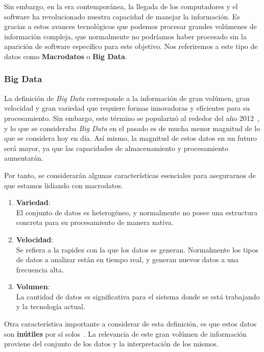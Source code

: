 Sin embargo, en la era contemporánea, la llegada de los computadores y el software ha revolucionado nuestra capacidad de manejar la información. Es gracias a estos avances tecnológicos que podemos procesar grandes volúmenes de información compleja, que normalmente no podríamos haber procesado sin la aparición de software específico para este objetivo. Nos referiremos a este tipo de datos como \textbf{Macrodatos} o \textbf{Big Data}\cite{mcafee2012bigdata}.

\subsubsection{Big Data}

La definición de \textit{Big Data} corresponde a la información de gran volúmen, gran velocidad y gran variedad que requiere formas innovadoras y eficientes para su procesamiento. Sin embargo, este término se popularizó al rededor del año 2012~\cite{diebold2012bigdata}, y lo que se consideraba \textit{Big Data} en el pasado es de mucha menor magnitud de lo que se considera hoy en día. Así mismo, la magnitud de estos datos en un futuro será mayor, ya que las capacidades de almacenamiento y procesamiento aumentarán.

Por tanto, se considerarán algunas características esenciales para asegurarnos de que estamos lidiando con macrodatos.
\begin{enumerate}
    \item \textbf{Variedad}: \\
        El conjunto de datos es heterogéneo, y normalmente no posee una estructura concreta para su procesamiento de manera nativa.
    \item \textbf{Velocidad}: \\
        Se refiera a la rapidez con la que los datos se generan. Normalmente los tipos de datos a analizar están en tiempo real, y generan nuevos datos a una frecuencia alta.
    \item \textbf{Volumen}: \\
        La cantidad de datos es significativa para el sistema donde se está trabajando y la tecnología actual.
\end{enumerate}

Otra característica importante a considerar de esta definición, es que estos datos son \textbf{inútiles} por sí solos~\cite{gandomi2015beyond}. La relevancia de este gran volúmen de información proviene del conjunto de los datos y la interpretación de los mismos. 

